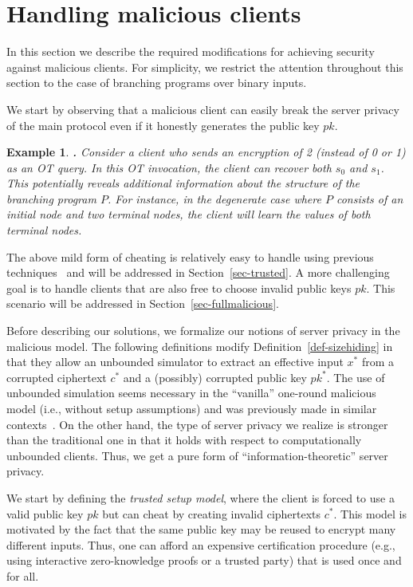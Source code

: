 \documentclass{article}
\newtheorem{EXAMPLE}{Example}[section]
\newenvironment{example}{\begin{EXAMPLE} \hspace{-.85em} {\bf .} \rm}%
	{\end{EXAMPLE}}
\begin{document}
\section{Handling malicious clients}
\label{sec-malicious}

In this section we describe the required modifications for
achieving security against malicious clients.
For simplicity, we restrict the
attention throughout this section to the case of branching programs
over binary inputs.

We start by observing that a malicious client can easily break the
server privacy of the main protocol even if it honestly generates
the public key $pk$.

\begin{example}
\label{ex-simpleattack} Consider a client who sends an encryption
of 2 (instead of 0 or 1) as an OT query. In this OT invocation, the
client can recover both $s_0$ and $s_1$. This potentially reveals
additional information about the structure of the branching program
$P$. For instance, in the degenerate case where $P$ consists of an
initial node and two terminal nodes, the client will learn the
values of both terminal nodes.
\end{example}

The above mild form of cheating is relatively easy to handle using
previous techniques~\cite{GIKM,AIR01,L05} and will be addressed in
Section~\ref{sec-trusted}. A more challenging goal is to handle
clients that are also free to choose invalid public keys $pk$. This
scenario will be addressed in Section~\ref{sec-fullmalicious}.

Before describing our solutions, we formalize our notions of server
privacy in the malicious model. The following definitions modify
Definition~\ref{def-sizehiding} in that they allow an unbounded
simulator to extract an effective input $x^*$ from a corrupted
ciphertext $c^*$ and a (possibly) corrupted public key $pk^*$. The
use of unbounded simulation seems necessary in the ``vanilla''
one-round malicious model (i.e., without setup assumptions) and was
previously made in similar
contexts~\cite{NP01,AIR01,FIPR05,T05,L05}. On the other hand, the
type of server privacy we realize is stronger than the traditional
one in that it holds with respect to computationally unbounded
clients. Thus, we get a pure form of ``information-theoretic''
server privacy.

We start by defining the {\em trusted setup model}, where the
client is forced to use a valid public key $pk$ but can cheat by
creating invalid ciphertexts $c^*$. This model is motivated by the
fact that the same public key may be reused to encrypt many
different inputs. Thus, one can afford an expensive certification
procedure (e.g., using interactive zero-knowledge proofs or a
trusted party) that is used once and for all.
\end{document}
